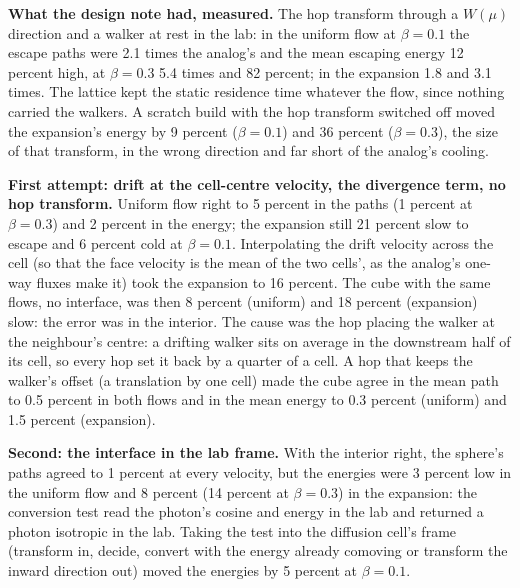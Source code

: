 \documentclass[11pt]{article}
\begin{document}
\textbf{What the design note had, measured.}  The hop transform through a $W(\mu)$
direction and a walker at rest in the lab: in the uniform flow at $\beta = 0.1$ the
escape paths were 2.1 times the analog's and the mean escaping energy 12 percent high,
at $\beta = 0.3$ 5.4 times and 82 percent; in the expansion 1.8 and 3.1 times.  The
lattice kept the static residence time whatever the flow, since nothing carried the
walkers.  A scratch build with the hop transform switched off moved the expansion's
energy by 9 percent ($\beta = 0.1$) and 36 percent ($\beta = 0.3$), the size of that
transform, in the wrong direction and far short of the analog's cooling.

\textbf{First attempt: drift at the cell-centre velocity, the divergence term, no hop
transform.}  Uniform flow right to 5 percent in the paths (1 percent at $\beta = 0.3$)
and 2 percent in the energy; the expansion still 21 percent slow to escape and 6
percent cold at $\beta = 0.1$.  Interpolating the drift velocity across the cell
(so that the face velocity is the mean of the two cells', as the analog's one-way
fluxes make it) took the expansion to 16 percent.  The cube with the same flows, no
interface, was then 8 percent (uniform) and 18 percent (expansion) slow: the error was
in the interior.  The cause was the hop placing the walker at the neighbour's centre:
a drifting walker sits on average in the downstream half of its cell, so every hop set
it back by a quarter of a cell.  A hop that keeps the walker's offset (a translation by
one cell) made the cube agree in the mean path to 0.5 percent in both flows and in
the mean energy to 0.3 percent (uniform) and 1.5 percent (expansion).

\textbf{Second: the interface in the lab frame.}  With the interior right, the sphere's
paths agreed to 1 percent at every velocity, but the energies were 3 percent low in the
uniform flow and 8 percent (14 percent at $\beta = 0.3$) in the expansion: the
conversion test read the photon's cosine and energy in the lab and returned a photon
isotropic in the lab.  Taking the test into the diffusion cell's frame (transform in,
decide, convert with the energy already comoving or transform the inward direction
out) moved the energies by 5 percent at $\beta = 0.1$.
\end{document}
